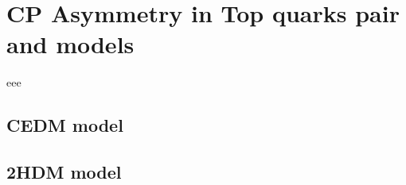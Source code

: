 

\section{CP Asymmetry in Top quarks pair and models}
\label{sec:AcpModel}

	eee

	\subsection{ CEDM model}
	\label{ssec:AcpModel_CEDM}



	\subsection{ 2HDM model}
	\label{ssec:AcpModel_2HDM}


\FloatBarrier
